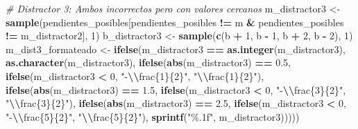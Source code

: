\documentclass[
]{article}
\newenvironment{Shaded}{\begin{snugshade}}{\end{snugshade}}
\newcommand{\CommentTok}[1]{\textcolor[rgb]{0.56,0.35,0.01}{\textit{#1}}}
\newcommand{\DecValTok}[1]{\textcolor[rgb]{0.00,0.00,0.81}{#1}}
\newcommand{\FloatTok}[1]{\textcolor[rgb]{0.00,0.00,0.81}{#1}}
\newcommand{\FunctionTok}[1]{\textcolor[rgb]{0.13,0.29,0.53}{\textbf{#1}}}
\newcommand{\NormalTok}[1]{#1}
\newcommand{\OtherTok}[1]{\textcolor[rgb]{0.56,0.35,0.01}{#1}}
\newcommand{\SpecialCharTok}[1]{\textcolor[rgb]{0.81,0.36,0.00}{\textbf{#1}}}
\newcommand{\StringTok}[1]{\textcolor[rgb]{0.31,0.60,0.02}{#1}}
\begin{document}
\begin{Shaded}
\begin{Highlighting}[]
  \CommentTok{\# Distractor 3: Ambos incorrectos pero con valores cercanos}
\NormalTok{  m\_distractor3 }\OtherTok{\textless{}{-}} \FunctionTok{sample}\NormalTok{(pendientes\_posibles[pendientes\_posibles }\SpecialCharTok{!=}\NormalTok{ m }\SpecialCharTok{\&}\NormalTok{ pendientes\_posibles }\SpecialCharTok{!=}\NormalTok{ m\_distractor2], }\DecValTok{1}\NormalTok{)}
\NormalTok{  b\_distractor3 }\OtherTok{\textless{}{-}} \FunctionTok{sample}\NormalTok{(}\FunctionTok{c}\NormalTok{(b }\SpecialCharTok{+} \DecValTok{1}\NormalTok{, b }\SpecialCharTok{{-}} \DecValTok{1}\NormalTok{, b }\SpecialCharTok{+} \DecValTok{2}\NormalTok{, b }\SpecialCharTok{{-}} \DecValTok{2}\NormalTok{), }\DecValTok{1}\NormalTok{)}
\NormalTok{  m\_dist3\_formateado }\OtherTok{\textless{}{-}} \FunctionTok{ifelse}\NormalTok{(m\_distractor3 }\SpecialCharTok{==} \FunctionTok{as.integer}\NormalTok{(m\_distractor3), }
                               \FunctionTok{as.character}\NormalTok{(m\_distractor3),}
                               \FunctionTok{ifelse}\NormalTok{(}\FunctionTok{abs}\NormalTok{(m\_distractor3) }\SpecialCharTok{==} \FloatTok{0.5}\NormalTok{, }
                                      \FunctionTok{ifelse}\NormalTok{(m\_distractor3 }\SpecialCharTok{\textless{}} \DecValTok{0}\NormalTok{, }\StringTok{"{-}}\SpecialCharTok{\textbackslash{}\textbackslash{}}\StringTok{frac\{1\}\{2\}"}\NormalTok{, }\StringTok{"}\SpecialCharTok{\textbackslash{}\textbackslash{}}\StringTok{frac\{1\}\{2\}"}\NormalTok{),}
                                      \FunctionTok{ifelse}\NormalTok{(}\FunctionTok{abs}\NormalTok{(m\_distractor3) }\SpecialCharTok{==} \FloatTok{1.5}\NormalTok{, }
                                             \FunctionTok{ifelse}\NormalTok{(m\_distractor3 }\SpecialCharTok{\textless{}} \DecValTok{0}\NormalTok{, }\StringTok{"{-}}\SpecialCharTok{\textbackslash{}\textbackslash{}}\StringTok{frac\{3\}\{2\}"}\NormalTok{, }\StringTok{"}\SpecialCharTok{\textbackslash{}\textbackslash{}}\StringTok{frac\{3\}\{2\}"}\NormalTok{),}
                                             \FunctionTok{ifelse}\NormalTok{(}\FunctionTok{abs}\NormalTok{(m\_distractor3) }\SpecialCharTok{==} \FloatTok{2.5}\NormalTok{, }
                                                    \FunctionTok{ifelse}\NormalTok{(m\_distractor3 }\SpecialCharTok{\textless{}} \DecValTok{0}\NormalTok{, }\StringTok{"{-}}\SpecialCharTok{\textbackslash{}\textbackslash{}}\StringTok{frac\{5\}\{2\}"}\NormalTok{, }\StringTok{"}\SpecialCharTok{\textbackslash{}\textbackslash{}}\StringTok{frac\{5\}\{2\}"}\NormalTok{),}
                                                    \FunctionTok{sprintf}\NormalTok{(}\StringTok{"\%.1f"}\NormalTok{, m\_distractor3)))))}

\end{Highlighting}
\end{Shaded}
\end{document}
